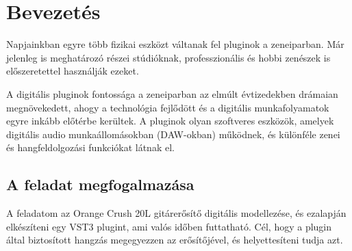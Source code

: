 \chapter{Bevezetés}
Napjainkban egyre több fizikai eszközt váltanak fel pluginok a zeneiparban. Már jelenleg is 
meghatározó részei stúdióknak, professzionális és hobbi zenészek is előszeretettel használják 
ezeket.

A digitális pluginok fontossága a zeneiparban az elmúlt évtizedekben drámaian megnövekedett, ahogy 
a technológia fejlődött és a digitális munkafolyamatok egyre inkább előtérbe kerültek. A pluginok 
olyan szoftveres eszközök, amelyek digitális audio munkaállomásokban (DAW-okban) működnek, és 
különféle zenei és hangfeldolgozási funkciókat látnak el.

\section{A feladat megfogalmazása}
A feladatom az Orange Crush 20L gitárerősítő digitális modellezése, és ezalapján elkészíteni egy 
VST3 plugint, ami valós időben futtatható. Cél, hogy a plugin által biztosított hangzás megegyezzen 
az erősítőjével, és helyettesíteni tudja azt.